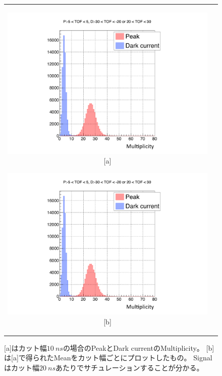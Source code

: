 \begin{figure}
  \begin{tabular}{cc}
    \begin{minipage}[t]{0.45\hsize}
      \centering
      \includegraphics[keepaspectratio, scale=0.3, page=1]{images/chapter3/Analysis3.pdf}
      [a]
    \end{minipage}
    \begin{minipage}[t]{0.45\hsize}
      \centering
      \includegraphics[keepaspectratio, scale=0.3, page=2]{images/chapter3/Analysis3.pdf}
      [b]
    \end{minipage}
  \end{tabular}
  \caption{
  [a]はカット幅$\SI{10}{ns}$の場合のPeakとDark currentのMultiplicity。
  [b]は[a]で得られたMeanをカット幅ごとにプロットしたもの。
  Signalはカット幅$\SI{20}{ns}$あたりでサチュレーションすることが分かる。
  }
  \label{fig:Multiplicity_hist}
\end{figure}

